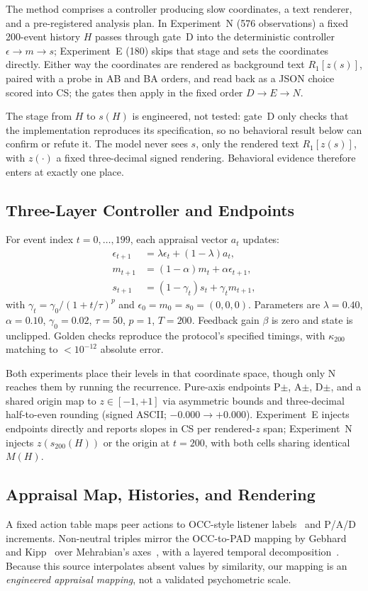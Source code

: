\documentclass[sigconf]{acmart}
\begin{document}
The method comprises a controller producing slow coordinates, a text renderer, and a pre-registered analysis plan. In Experiment~N (576 observations) a fixed 200-event history $H$ passes through gate~D into the deterministic controller $\epsilon\rightarrow m\rightarrow s$; Experiment~E (180) skips that stage and sets the coordinates directly. Either way the coordinates are rendered as background text $R_1[z(s)]$, paired with a probe in AB and BA orders, and read back as a JSON choice scored into CS; the gates then apply in the fixed order $D\rightarrow E\rightarrow N$.

The stage from $H$ to $s(H)$ is engineered, not tested: gate~D only checks that the implementation reproduces its specification, so no behavioral result below can confirm or refute it. The model never sees $s$, only the rendered text $R_1[z(s)]$, with $z(\cdot)$ a fixed three-decimal signed rendering. Behavioral evidence therefore enters at exactly one place.

\subsection{Three-Layer Controller and Endpoints}
For event index $t{=}0,\ldots,199$, each appraisal vector $a_t$ updates:
\begin{align}
\epsilon_{t+1}&=\lambda\epsilon_t+(1-\lambda)a_t,\\
m_{t+1}&=(1-\alpha)m_t+\alpha\epsilon_{t+1},\\
s_{t+1}&=(1-\gamma_t)s_t+\gamma_t m_{t+1},
\end{align}
with $\gamma_t=\gamma_0/(1+t/\tau)^p$ and $\epsilon_0{=}m_0{=}s_0{=}(0,0,0)$. Parameters are $\lambda{=}0.40$, $\alpha{=}0.10$, $\gamma_0{=}0.02$, $\tau{=}50$, $p{=}1$, $T{=}200$. Feedback gain $\beta$ is zero and state is unclipped. Golden checks reproduce the protocol's specified timings, with $\kappa_{200}$ matching to $<10^{-12}$ absolute error.

Both experiments place their levels in that coordinate space, though only N reaches them by running the recurrence. Pure-axis endpoints P$\pm$, A$\pm$, D$\pm$, and a shared origin map to $z\in[-1,+1]$ via asymmetric bounds and three-decimal half-to-even rounding (signed ASCII; $-0.000\rightarrow{+}0.000$). Experiment~E injects endpoints directly and reports slopes in CS per rendered-$z$ span; Experiment~N injects $z(s_{200}(H))$ or the origin at $t{=}200$, with both cells sharing identical $M(H)$.

\subsection{Appraisal Map, Histories, and Rendering}
A fixed action table maps peer actions to OCC-style listener labels~\cite{ortony1988cognitive} and P/A/D increments. Non-neutral triples mirror the OCC-to-PAD mapping by Gebhard and Kipp~\cite{gebhard2006plausible} over Mehrabian's axes~\cite{mehrabian1996pad}, with a layered temporal decomposition~\cite{gebhard2005alma}. Because this source interpolates absent values by similarity, our mapping is an \emph{engineered appraisal mapping}, not a validated psychometric scale.
\end{document}

